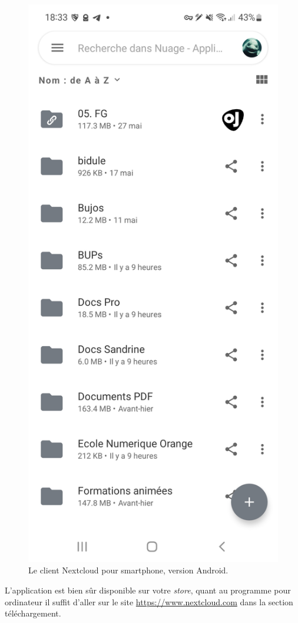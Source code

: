 \begin{multicols}{2}
\begin{figure}
	\centering
	\includegraphics{./Captures/nextcloud-client.smartphone.jpg}
	\caption{Le client Nextcloud pour smartphone, version Android.}
\end{figure}
\end{multicols}
L'application est bien sûr disponible sur votre \emph{store\/}, quant au programme pour ordinateur il suffit d'aller sur le site \url{https://www.nextcloud.com} dans la section téléchargement.

